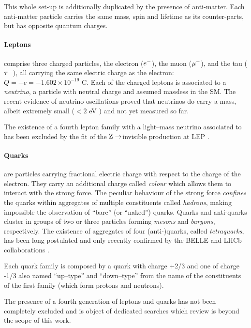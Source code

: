 This whole set-up is additionally duplicated by the presence of anti-matter. Each anti-matter particle carries the same mass, spin and lifetime as its counter-parts, but has opposite quantum charges.

\paragraph{Leptons} comprise three charged particles, the electron ($e\-$), the muon ($\mu\-$), and the tau ($\tau\-$), all carrying the same electric charge as the electron: $Q = -e = -1.602 \times 10^{-19}$ C. Each of the charged leptons is associated to a \emph{neutrino}, a particle with neutral charge and assumed massless in the SM. The recent evidence of neutrino oscillations \cite{Agafonova:2010dc} proved that neutrinos do carry a mass, albeit extremely small ($< 2$ eV \cite{pdg}) and not yet measured so far. 

The existence of a fourth lepton family with a light--mass neutrino associated to has been excluded by the fit of the $\Z\To$invisible production at LEP \cite{ALEPH:2005ab}. 

\paragraph{Quarks} are particles carrying fractional electric charge with respect to the charge of the electron. They carry an additional charge called \emph{colour} which allows them to interact with the strong force. The peculiar behaviour of the strong force \emph{confines} the quarks within aggregates of multiple constituents called \emph{hadrons}, making impossible the observation of ``bare'' (or ``naked'') quarks. Quarks and anti-quarks cluster in groups of two or three particles forming \emph{mesons} and \emph{baryons}, respectively. The existence of aggregates of four (anti-)quarks, called \emph{tetraquarks}, has been long postulated and only recently confirmed by the BELLE \cite{Choi:2007wga} and LHCb collaborations \cite{Aaij:2014jqa}.

Each quark family is composed by a quark with charge +2/3 and one of charge -1/3 also named ``up--type'' and ``down--type'' from the name of the constituents of the first family (which form protons and neutrons).

The presence of a fourth generation of leptons and quarks has not been completely excluded and is object of dedicated searches which review is beyond the scope of this work.

